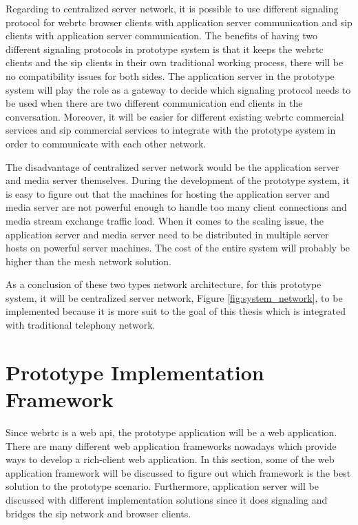 \par Regarding to centralized server network, it is possible to use different signaling protocol for \gls{webrtc} browser clients with application server communication and \gls{sip} clients with application server communication. The benefits of having two different signaling protocols in prototype system is that it keeps the \gls{webrtc} clients and the \gls{sip} clients in their own traditional working process, there will be no compatibility issues for both sides. The application server in the prototype system will play the role as a gateway to decide which signaling protocol needs to be used when there are two different communication end clients in the conversation. Moreover, it will be easier for different existing \gls{webrtc} commercial services and \gls{sip} commercial services to integrate with the prototype system in order to communicate with each other network.

\par The disadvantage of centralized server network would be the application server and media server themselves. During the development of the prototype system, it is easy to figure out that the machines for hosting the application server and media server are not powerful enough to handle too many client connections and media stream exchange traffic load. When it comes to the scaling issue, the application server and media server need to be distributed in multiple server hosts on powerful server machines. The cost of the entire system will probably be higher than the mesh network solution.

\par As a conclusion of these two types network architecture, for this prototype system, it will be centralized server network, Figure \ref{fig:system_network}, to be implemented because it is more suit to the goal of this thesis which is integrated with traditional telephony network.

\section{Prototype Implementation Framework}

\noindent Since \gls{webrtc} is a web \gls{api}, the prototype application will be a web application. There are many different web application frameworks nowadays which provide ways to develop a rich-client web application. In this section, some of the web application framework will be discussed to figure out which framework is the best solution to the prototype scenario. Furthermore, application server will be discussed with different implementation solutions since it does signaling and bridges the \gls{sip} network and browser clients.

